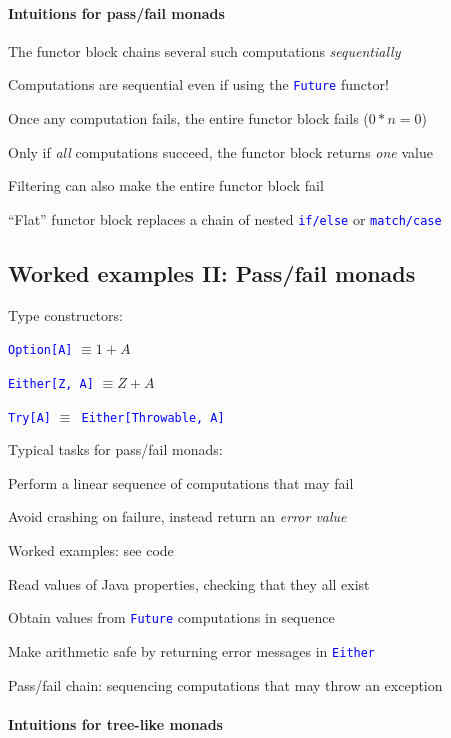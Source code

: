 \paragraph{Intuitions for pass/fail monads }

The functor block chains several such computations \emph{sequentially}

Computations are sequential even if using the \texttt{\textcolor{blue}{\footnotesize{}Future}}
functor!

Once any computation fails, the entire functor block fails ($0*n=0$)

Only if \emph{all} computations succeed, the functor block returns
\emph{one} value

Filtering can also make the entire functor block fail

``Flat'' functor block replaces a chain of nested \texttt{\textcolor{blue}{\footnotesize{}if/else}}
or \texttt{\textcolor{blue}{\footnotesize{}match/case}} 


\subsection{Worked examples II: Pass/fail monads}

Type constructors:

\texttt{\textcolor{blue}{\footnotesize{}Option{[}A{]}}} $\equiv1+A$

\texttt{\textcolor{blue}{\footnotesize{}Either{[}Z, A{]}}} $\equiv Z+A$

\texttt{\textcolor{blue}{\footnotesize{}Try{[}A{]}}} $\equiv$\texttt{\textcolor{blue}{\footnotesize{}
Either{[}Throwable, A{]}}} 

Typical tasks for pass/fail monads:

Perform a linear sequence of computations that may fail

Avoid crashing on failure, instead return an \emph{error value}

Worked examples: see code

Read values of Java properties, checking that they all exist

Obtain values from \texttt{\textcolor{blue}{\footnotesize{}Future}}
computations in sequence

Make arithmetic safe by returning error messages in \texttt{\textcolor{blue}{\footnotesize{}Either}} 

Pass/fail chain: sequencing computations that may throw an exception


\paragraph{Intuitions for tree-like monads}

